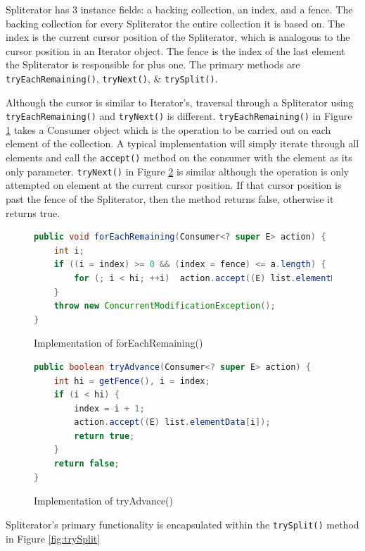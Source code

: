 \documentclass[]{article}
\begin{document}
 Spliterator has 3 instance fields: a backing collection, an index, and a fence. The backing collection for every Spliterator the entire collection it is based on. The index is the current cursor position of the Spliterator, which is analogous to the cursor position in an Iterator object. The fence is the index of the last element the Spliterator is responsible for plus one. The primary methods are \verb|tryEachRemaining()|, \verb|tryNext()|, \& \verb|trySplit()|. 

Although the cursor is similar to Iterator's, traversal through a Spliterator using \verb|tryEachRemaining()| and \verb|tryNext()| is different. \verb|tryEachRemaining()| in Figure \ref{fig:forEachRemaining} takes a Consumer object which is the operation to be carried out on each element of the collection. A typical implementation will simply iterate through all elements and call the \verb|accept()| method on the consumer with the element as its only parameter. \verb|tryNext()| in Figure \ref{fig:tryAdvance} is similar although the operation is only attempted on element at the current cursor position. If that cursor position is past the fence of the Spliterator, then the method returns false, otherwise it returns true.

\begin{figure}[H]
\begin{lstlisting}[language=Java]
public void forEachRemaining(Consumer<? super E> action) {
    int i;
    if ((i = index) >= 0 && (index = fence) <= a.length) {
        for (; i < hi; ++i)  action.accept((E) list.elementData[i]);
    }
    throw new ConcurrentModificationException();
}
\end{lstlisting}
\caption{Implementation of forEachRemaining()}
\label{fig:forEachRemaining}
\end{figure}

\begin{figure}[H]
\begin{lstlisting}[language=Java]
public boolean tryAdvance(Consumer<? super E> action) {
    int hi = getFence(), i = index;
    if (i < hi) {
        index = i + 1;
        action.accept((E) list.elementData[i]);
        return true;
    }
    return false;
}
\end{lstlisting}
\caption{Implementation of tryAdvance()}
\label{fig:tryAdvance}
\end{figure}

Spliterator's primary functionality is encapsulated within the \verb|trySplit()| method in Figure \ref{fig:trySplit}
\end{document}
